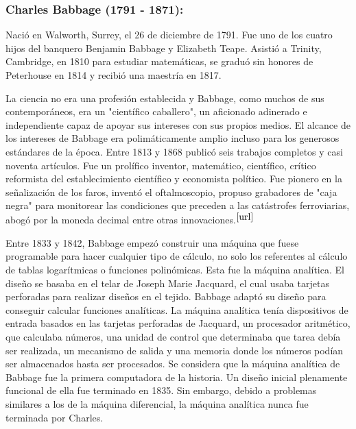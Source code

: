 \documentclass[runningheads,a4paper]{llncs}
\begin{document}
\subsubsection{Charles Babbage (1791 - 1871):} Nació en Walworth, Surrey, el 26 de diciembre de 1791. Fue uno de los cuatro hijos del banquero Benjamin Babbage y Elizabeth Teape. Asistió a Trinity, Cambridge, en 1810 para estudiar matemáticas, se graduó sin honores de Peterhouse en 1814 y recibió una maestría en 1817.
 
La ciencia no era una profesión establecida y Babbage, como muchos de sus contemporáneos, era un "científico caballero", un aficionado adinerado e independiente capaz de apoyar sus intereses con sus propios medios. El alcance de los intereses de Babbage era polimáticamente amplio incluso para los generosos estándares de la época. Entre 1813 y 1868 publicó seis trabajos completos y casi noventa artículos. Fue un prolífico inventor, matemático, científico, crítico reformista del establecimiento científico y economista político. Fue pionero en la señalización de los faros, inventó el oftalmoscopio, propuso grabadores de "caja negra" para monitorear las condiciones que preceden a las catástrofes ferroviarias, abogó por la moneda decimal entre otras innovaciones.$^{\cite{url}}$

Entre 1833 y 1842, Babbage empezó construir una máquina que fuese programable para hacer cualquier tipo de cálculo, no solo los referentes al cálculo de tablas logarítmicas o funciones polinómicas. Esta fue la máquina analítica. El diseño se basaba en el telar de Joseph Marie Jacquard, el cual usaba tarjetas perforadas para realizar diseños en el tejido. Babbage adaptó su diseño para conseguir calcular funciones analíticas. La máquina analítica tenía dispositivos de entrada basados en las tarjetas perforadas de Jacquard, un procesador aritmético, que calculaba números, una unidad de control que determinaba que tarea debía ser realizada, un mecanismo de salida y una memoria donde los números podían ser almacenados hasta ser procesados. Se considera que la máquina analítica de Babbage fue la primera computadora de la historia. Un diseño inicial plenamente funcional de ella fue terminado en 1835. Sin embargo, debido a problemas similares a los de la máquina diferencial, la máquina analítica nunca fue terminada por Charles. 
\end{document}
